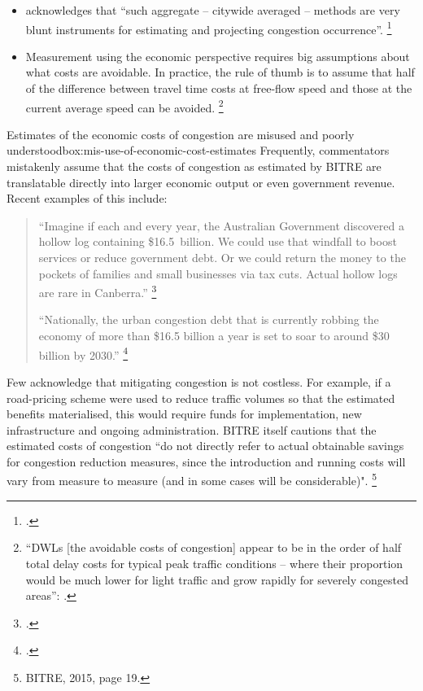 \documentclass{grattan}
\begin{document}
\begin{itemize}
\item  \textcite{BITRE-2015-Traffic-and-congestion-cost-trends-for-Aust-capital-cities} acknowledges that ``such aggregate -- citywide averaged -- methods are very blunt instruments for estimating and projecting congestion occurrence''.
    \footcite[][15]{BITRE-2015-Traffic-and-congestion-cost-trends-for-Aust-capital-cities}
\item Measurement using the economic perspective requires big assumptions about what costs are avoidable. In practice, the rule of thumb is to assume that half of the difference between travel time costs at free-flow speed and those at the current average speed can be avoided.%
    \footnote{``DWLs [the avoidable costs of congestion] appear to be in the order of half total delay costs for typical peak traffic conditions -- where their proportion would be much lower for light traffic and grow rapidly for severely congested areas'':
    \textcite[][78]{BITRE-2007-Estimating-urban-traffic-and-congestion-cost-trends}.}

\end{itemize}

\begin{smallbox}{Estimates of the economic costs of congestion are misused and poorly understood}{box:mis-use-of-economic-cost-estimates}
Frequently, commentators mistakenly assume that the costs of congestion as estimated by BITRE are translatable directly into larger economic output or even government revenue.
Recent examples of this include:

\microtypeforquote
\begin{quote}
\textquotedblleft Imagine if each and every year, the Australian Government discovered a hollow log containing \$16.5~billion. We could use that windfall to boost services or reduce government debt. Or we could return the money to the pockets of families and small businesses via tax cuts. Actual hollow logs are rare in Canberra.''%
    \footcite{Albanese-2017-Congestion-handbrake-on-growth}

``Nationally, the urban congestion debt that is currently robbing the economy of more than \$16.5 billion a year is set to soar to around \$30 billion by 2030.''%
    \footcite{Chester-VTA-2017-Freight-speech}

\end{quote}

Few acknowledge that mitigating congestion is not costless. For example, if a road-pricing scheme were used to reduce traffic volumes so that the estimated benefits materialised, this would require funds for implementation, new infrastructure and ongoing administration. BITRE itself cautions that the estimated costs of congestion ``do not directly refer to actual obtainable savings for congestion reduction measures, since the introduction and running costs will vary from measure to measure (and in some cases will be considerable)".%
    \footnote{BITRE, 2015, page 19.}
\end{smallbox}
\end{document}
